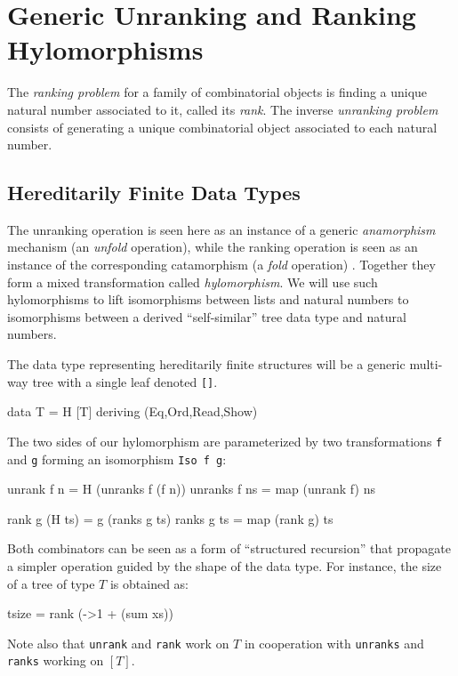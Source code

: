 \documentclass[]{INCLUDES/llncs}
\begin{document}
\section{Generic Unranking and Ranking Hylomorphisms}
\label{unrank}

The {\em ranking problem} for a family of
combinatorial objects is finding a unique 
natural number associated to it,
called its {\em rank}.
The inverse {\em unranking problem} consists of generating a unique
combinatorial object associated to each natural number. 

\subsection{Hereditarily Finite Data Types}

The unranking operation is seen here as an instance of a generic
{\em anamorphism} mechanism (an {\em unfold} operation), while the ranking
operation is seen as an instance of the corresponding catamorphism (a {\em
fold} operation) \cite{DBLP:journals/jfp/Hutton99,DBLP:conf/fpca/MeijerH95}.
Together they form a mixed transformation called {\em hylomorphism}. 
We will use such hylomorphisms to lift isomorphisms between lists
and natural numbers to isomorphisms between a derived ``self-similar'' tree
data type and natural numbers.

The data type representing hereditarily finite structures will be
a generic multi-way tree with a single leaf denoted {\tt []}.

\begin{code}
data T = H [T] deriving (Eq,Ord,Read,Show)
\end{code}
The two sides of our hylomorphism 
are parameterized by two transformations
{\tt f} and {\tt g} forming
an isomorphism {\tt Iso f g}:
\begin{code}
unrank f n = H (unranks f (f n))
unranks f ns = map (unrank f) ns

rank g (H ts) = g (ranks g ts)
ranks g ts = map (rank g) ts
\end{code}
Both combinators can be seen as a form of ``structured recursion''
that propagate a simpler operation guided by the shape of
the data type. For instance, the size of a tree of type $T$ is
obtained as:
\begin{code}
tsize = rank (\xs->1 + (sum xs))
\end{code}
Note also that {\tt unrank} and {\tt rank}
work on $T$ in cooperation
with {\tt unranks} and {\tt ranks} 
working on $[T]$. 
\end{document}
